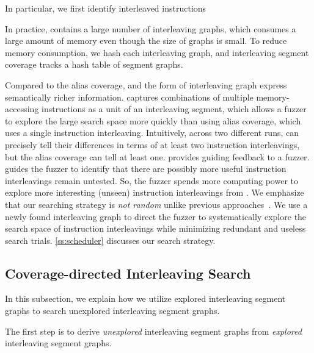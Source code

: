 In particular, we first identify interleaved instructions


In practice, \intcov contains a large number of interleaving graphs, 
which consumes a large amount of memory even though the size of graphs is 
small.
%
To reduce memory consumption, we hash each interleaving graph,
and interleaving segment coverage tracks a hash table of segment
graphs.
%





%
%
Compared to the alias coverage, \intcov and the form of interleaving graph
express semantically richer information. \Intcov captures combinations 
of multiple memory-accessing instructions as a unit of an interleaving segment, which allows a fuzzer to explore the large search space more quickly than using alias coverage, which uses a single instruction interleaving. Intuitively, across two different runs, \intcov can precisely tell 
their differences in terms of at least two instruction interleavings, 
but the alias coverage can tell at least one.
\Intcov provides guiding feedback to a fuzzer.
\Intcov guides the fuzzer to identify that there are possibly more useful instruction interleavings remain untested. So, the fuzzer spends
more computing power to explore more interesting (unseen) instruction interleavings from \intcov. We emphasize that our searching strategy is 
\textit{not random} unlike previous approaches~\cite{krace, ski, pctalgorithm, muzz}.
%
We use a newly found interleaving graph to
direct the fuzzer to systematically explore the search space of
instruction interleavings while minimizing redundant and useless
search trials. \autoref{ss:scheduler} discusses our search strategy.


\subsection{Coverage-directed Interleaving Search}
\label{ss:scheduler}
%
In this subsection, we explain how we utilize explored interleaving
segment graphs to search unexplored interleaving segment graphs.

%
The first step is to derive \textit{unexplored} interleaving segment
graphs from \textit{explored} interleaving segment graphs.

